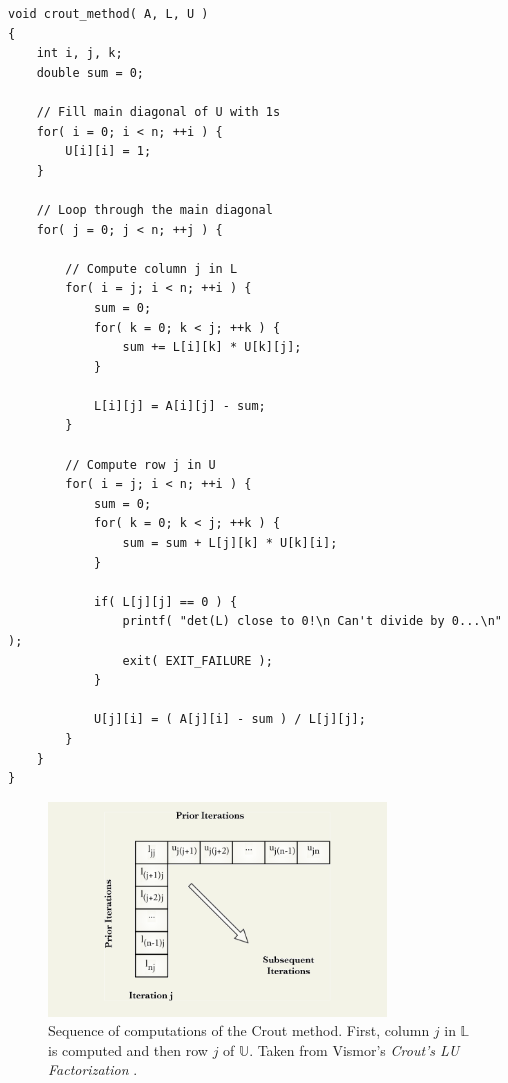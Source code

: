 \begin{lstlisting}[caption={C++ pseudo-code implementing Crout's matrix decomposition algorithm. It assumes that \code{A[n][n]} is a two-dimensional array that represents the invertible square coefficient matrix $ \mathbb{A} $; \code{L[n][n]} and \code{U[n][n]} are also two-dimensional arrays reprenting matrices $ \mathbb{L} $ and $ \mathbb{U} $ respectively. Furthermore, it is assumed that \code{L} and \code{U} are populated with zeros. Derived from \emph{Crout's LU Factorization} \cite{rqjYYJkSwERYYbSy}, \emph{Numerical recipes: the art of scientific computing} \cite{Press2007} and \emph{Crout matrix decomposition} \cite{TgtpOw7zCHo3ii0m}.},label={Listing:LU-decomposition-crout-method-pseudocode}]
void crout_method( A, L, U )
{
	int i, j, k;
	double sum = 0;
	
	// Fill main diagonal of U with 1s
	for( i = 0; i < n; ++i ) {
		U[i][i] = 1;
	}	

	// Loop through the main diagonal
	for( j = 0; j < n; ++j ) {
		
		// Compute column j in L
		for( i = j; i < n; ++i ) {
			sum = 0;
			for( k = 0; k < j; ++k ) {
				sum += L[i][k] * U[k][j];
			}

			L[i][j] = A[i][j] - sum;
		}
		
		// Compute row j in U
		for( i = j; i < n; ++i ) {
			sum = 0;
			for( k = 0; k < j; ++k ) {
				sum = sum + L[j][k] * U[k][i];
			}

			if( L[j][j] == 0 ) {
				printf( "det(L) close to 0!\n Can't divide by 0...\n" );
				exit( EXIT_FAILURE );
			}

			U[j][i] = ( A[j][i] - sum ) / L[j][j];
		}
	}
}
\end{lstlisting}

\begin{figure}[h!]
	\centering
	\includegraphics[width=0.8\textwidth, keepaspectratio]{images/ch1/LU_decomposition_crout_method_visualization.png}
	\caption{Sequence of computations of the Crout method. First, column $ j $ in $ \mathbb{L} $ is computed and then row $ j $ of $ \mathbb{U} $. Taken from Vismor's \emph{Crout's LU Factorization} \cite{rqjYYJkSwERYYbSy}.}
	\label{Figure:LU-decomposition-crout-method-visualisation}
\end{figure}

